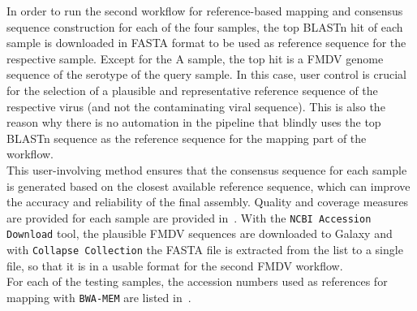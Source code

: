 In order to run the second workflow for reference-based mapping and consensus sequence construction for each of the four samples, the top \ac{BLAST}n hit of each sample is downloaded in FASTA format to be used as reference sequence for the respective sample. Except for the A sample, the top hit is a \ac{FMDV} genome sequence of the serotype of the query sample. In this case, user control is crucial for the selection of a plausible and representative reference sequence of the respective virus (and not the contaminating viral sequence). This is also the reason why there is no automation in the pipeline that blindly uses the top \ac{BLAST}n sequence as the reference sequence for the mapping part of the workflow.\\
This user-involving method ensures that the consensus sequence for each sample is generated based on the closest available reference sequence, which can improve the accuracy and reliability of the final assembly. Quality and coverage measures are provided for each sample are provided in~. With the \texttt{NCBI Accession Download} tool, the plausible \ac{FMDV} sequences are downloaded to Galaxy and with \texttt{Collapse Collection} the FASTA file is extracted from the list to a single file, so that it is in a usable format for the second \ac{FMDV} workflow.\\
For each of the testing samples, the accession numbers used as references for mapping with \texttt{BWA-MEM} are listed in~. 


